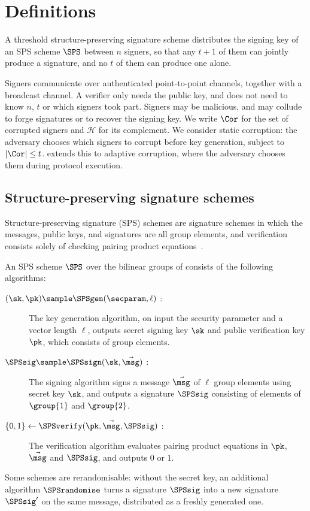 \section{Definitions}\label{sec:tsps-definitions}

A threshold structure-preserving signature scheme distributes the signing key of
an SPS scheme $\SPS$ between $n$ signers, so that any $t+1$ of them can jointly produce a signature, and no
$t$ of them can produce one alone.

Signers communicate over authenticated point-to-point channels, together with a
broadcast channel. A verifier only needs the public key, and does not need to
know $n$, $t$ or which signers took part. Signers may be malicious, and may
collude to forge signatures or to recover the signing key. We write $\Cor$ for
the set of corrupted signers and $\mathcal{H}$ for its complement. We consider
static corruption: the adversary chooses which signers to corrupt before key
generation, subject to $|\Cor| \leq t$.  extends this to
adaptive corruption, where the adversary chooses them during protocol
execution.

\subsection{Structure-preserving signature schemes}\label{sec:tsps-sps}

Structure-preserving signature (SPS) schemes are signature schemes in which the messages,
public keys, and signatures are all group elements, and verification consists
solely of checking pairing product
equations~\cite{C:AFGHO10,C:AGHO11,TCC:AGOT14,C:KilPanWee15,AC:Groth15,RSA:Ghadafi16}.


An SPS scheme $\SPS$ over the bilinear groups of 
consists of the following
algorithms:

\begin{description}

  \item[$(\sk, \pk) \sample \SPSgen(\secparam, \ell)$ :] The key generation
algorithm, on input the security parameter and a vector length $\ell$, outputs
secret signing key $\sk$ and public verification key $\pk$, which consists of
group elements.

  \item[$\SPSsig \sample \SPSsign(\sk, \vec{\msg})$ :] The signing algorithm
signs a message $\vec{\msg}$ of $\ell$ group elements using secret key $\sk$, and
outputs
a signature $\SPSsig$ consisting of elements of $\group{1}$ and $\group{2}$.

  \item[$\{0,1\} \leftarrow \SPSverify(\pk, \vec{\msg}, \SPSsig)$ :]
The verification algorithm evaluates pairing product equations in $\pk$,
$\vec{\msg}$ and $\SPSsig$, and outputs $0$ or $1$.

\end{description}
%
Some schemes are rerandomisable: without the secret key, an additional
algorithm $\SPSrandomise$ turns a signature $\SPSsig$ into a new signature
$\SPSsig'$ on the same message, distributed as a freshly generated one.

